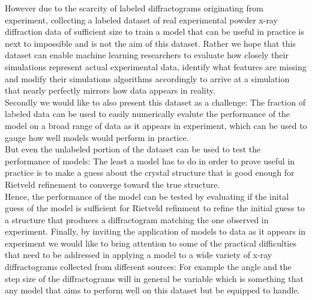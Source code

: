 However due to the scarcity of labeled diffractograms originating from experiment, collecting a labeled dataset
of real experimental powder x-ray diffraction data of sufficient size to train a model
that can be useful in practice is next to impossible and is not the aim of this dataset.
Rather we hope that this dataset can enable machine learning researchers to evaluate how closely their simulations
represent actual experimental data, identify what features are missing and modify their simulations algorithms
accordingly to arrive at a simulation that nearly perfectly mirrors how data appears in reality. \\

Secondly we would like to also present this dataset as a challenge: The fraction of labeled data can be used to
easily numerically evalute the performance of the model on a broad range of data as it appears in experiment, which can be used
to gauge how well models would perform in practice. \\
But even the unlabeled portion of the dataset can be used to test the performance of models: The least a model
has to do in order to prove useful in practice is to make a guess about the crystal structure that is good enough
for Rietveld refinement to converge toward the true structure. \\
Hence, the performance of the model can be tested by evaluating if the inital guess of the model is sufficient for
Rietveld refinment to refine the initial guess to a structure that produces a diffractogram matching the one observed in experiment.
Finally, by inviting the application of models to data as it appears in experiment we would like to bring attention
to some of the practical difficulties that need to be addressed in applying a model to a wide variety of x-ray diffractograms
collected from different sources: For example the angle and the step size of the diffractograms will in general be variable
which is something that any model that aims to perform well on this dataset but be equipped to handle.







